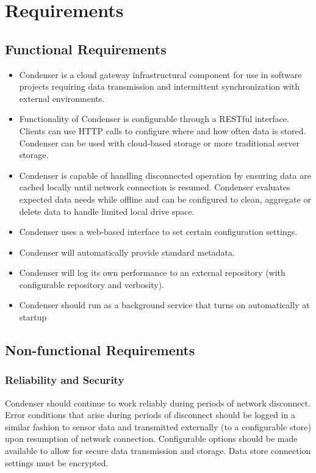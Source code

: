 \section{Requirements}
	
	\subsection{Functional Requirements}
\begin{itemize}
\item Condenser is a cloud gateway infrastructural component for use in software projects requiring data transmission and intermittent synchronization with external environments. 

\item Functionality of Condenser is configurable through a RESTful interface. Clients can use HTTP calls to configure where and how often data is stored. Condenser can be used with cloud-based storage or more traditional server storage.

\item Condenser is capable of handling disconnected operation by ensuring data are cached locally until network connection is resumed. Condenser evaluates expected data needs while offline and can be configured to clean, aggregate or delete data to handle limited local drive space.

\item Condenser uses a web-based interface to set certain configuration settings. 

\item Condenser will automatically provide standard metadata.

\item Condenser will log its own performance to an external repository (with configurable repository and verbosity).

\item Condenser should run as a background service that turns on automatically at startup
\end{itemize}
	\subsection{Non-functional Requirements}
		\subsubsection{Reliability and Security}
Condenser should continue to work reliably during periods of network disconnect. Error conditions that arise during periods of disconnect should be logged in a similar fashion to sensor data and transmitted externally (to a configurable store) upon resumption of network connection. Configurable options should be made available to allow for secure data transmission and storage. Data store connection settings must be encrypted.		
